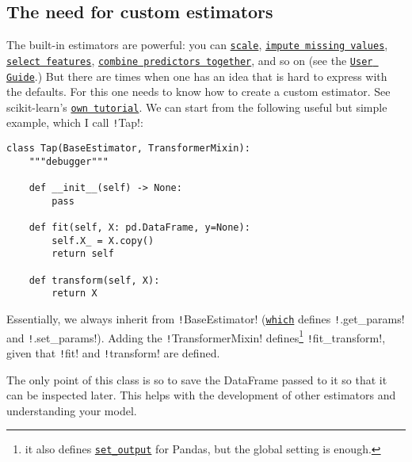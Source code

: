 \documentclass[11pt]{article}
\theoremstyle{definition}
\newcommand{\myhref}[2]{\href{#1}{\texttt{#2}}}
\begin{document}
\subsection{The need for custom estimators}
The built-in estimators are powerful: 
you can \myhref{https://scikit-learn.org/stable/auto_examples/preprocessing/plot_all_scaling.html\#plot-all-scaling-robust-scaler-section}
{scale},
\myhref{https://scikit-learn.org/stable/modules/impute.html\#impute}
{impute missing values},
\myhref{https://scikit-learn.org/stable/modules/feature_selection.html\#feature-selection}
{select features},
\myhref{https://scikit-learn.org/stable/modules/ensemble.html}
{combine predictors together}, 
and so on (see the 
\myhref{https://scikit-learn.org/stable/user_guide.html}
{User Guide}.) 
But there are times when one has an idea that is hard to express with the defaults. 
For this one needs to know how to create a custom estimator. See scikit-learn's 
\myhref{https://scikit-learn.org/stable/developers/develop.html}
{own tutorial}.
We can start from the following useful but simple example, which I call
\texttt!Tap!:
\begin{verbatim}
class Tap(BaseEstimator, TransformerMixin):
    """debugger"""

    def __init__(self) -> None:
        pass

    def fit(self, X: pd.DataFrame, y=None):
        self.X_ = X.copy()
        return self

    def transform(self, X):
        return X
\end{verbatim}
Essentially, we always inherit from \texttt!BaseEstimator!
(\myhref{https://scikit-learn.org/stable/modules/generated/sklearn.base.BaseEstimator.html\#sklearn.base.BaseEstimator.get_params}
{which} defines \texttt!.get_params! and \texttt!.set_params!). 
Adding the \texttt!TransformerMixin! defines\footnote{
it also defines \myhref{https://scikit-learn.org/stable/modules/generated/sklearn.base.TransformerMixin.html\#sklearn-base-transformermixin}
{set\_output} for Pandas, but the global setting is enough.
} \texttt!fit_transform!, given that \texttt!fit! and \texttt!transform! are defined. 

The only point of this class is so to save the DataFrame passed to it so that it can be inspected later. This helps with the development of other estimators and understanding your model.
\end{document}
